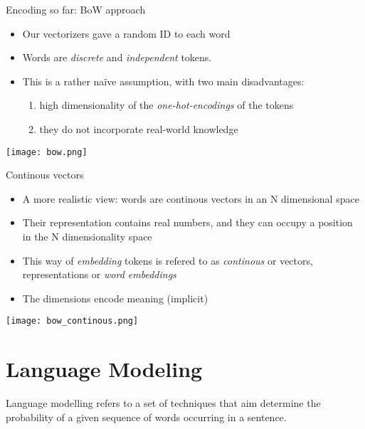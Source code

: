 \documentclass[compress]{beamer}
\begin{document}
\begin{frame}{Encoding so far: BoW approach}
	\begin{itemize}
		\item Our vectorizers gave a random ID to each word
		\item Words are \emph{discrete} and \emph{independent} tokens.
		\item This is a rather naïve assumption, with two main disadvantages:
\begin{enumerate}
	\item high dimensionality of the \emph{one-hot-encodings} of the tokens
	\item they do not incorporate real-world knowledge
\end{enumerate}
	\end{itemize}

\begin{center}
\texttt{[image: bow.png]}
\end{center}
\end{frame}

\begin{frame}{Continous vectors}
	\begin{itemize}
		\item A more realistic view: words are continous vectors in an N dimensional space
		\item Their representation contains real numbers, and they can occupy a position in the N dimensionality space
		\item This way of \emph{embedding} tokens is refered to as \emph{continous} or  vectors, representations or \emph{word embeddings}
		\item The dimensions encode meaning (implicit)
		\end{itemize}
\end{frame}

\begin{frame}
\begin{center}
	\texttt{[image: bow\_continous.png]}
\end{center}
\end{frame}

\section{Language Modeling}

\begin{frame}
Language modelling refers to a set of techniques that aim determine the probability of a given sequence of words occurring in a sentence.
\end{frame}
\end{document}
